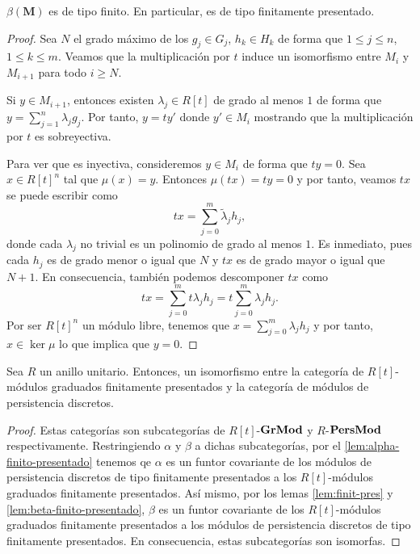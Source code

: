 \begin{lema}
	\label{lem:beta-finito-presentado}
	\(\beta(\mathbf{M})\) es de tipo finito. En particular, es de tipo finitamente presentado.
\end{lema}
\begin{proof}
	Sea \(N\) el grado máximo de los \(g_j \in G_j\), \(h_k \in H_k\) de forma que \(1 \leq j \leq n\), \(1 \leq k \leq m\). Veamos que la multiplicación por \(t\) induce un isomorfismo entre \(M_i\) y \(M_{i+1}\) para todo \(i \geq N\).
	
	Si \(y \in M_{i+1}\), entonces existen \(\lambda_j \in R[t]\) de grado al menos \(1\) de forma que \(y = \sum_{j=1}^n \lambda_j g_j\). Por tanto, \(y = ty'\) donde \(y' \in M_i\) mostrando que la multiplicación por \(t\) es sobreyectiva.
	
	Para ver que es inyectiva, consideremos \(y \in M_i\) de forma que \(ty = 0\). Sea \(x \in R[t]^n\) tal que \(\mu(x) = y\). Entonces \(\mu(tx) = ty = 0\) y por tanto, veamos \(tx\) se puede escribir como
	\[
		tx = \sum_{j=0}^m \tilde{\lambda}_j h_j,
	\]
	donde cada \(\lambda_j\) no trivial es un polinomio de grado al menos \(1\). Es inmediato, pues cada \(h_j\) es de grado menor o igual que \(N\) y \(tx\) es de grado mayor o igual que \(N+1\). En consecuencia, también podemos descomponer \(tx\) como
	\[
		tx = \sum_{j=0}^m t \lambda_j h_j = t \sum_{j=0}^m \lambda_j h_j.
	\]
	Por ser \(R[t]^n\) un módulo libre, tenemos que \( x = \sum_{j=0}^m \lambda_j h_j\) y por tanto, \(x \in \ker \mu\) lo que implica que \(y = 0\).
\end{proof}

\begin{teorema}
	\label{teo:correspondence}
	Sea \( R \) un anillo unitario. Entonces, un isomorfismo entre la categoría de \(R[t]\)-módulos graduados finitamente presentados y la categoría de módulos de persistencia discretos.
\end{teorema}
\begin{proof}
	Estas categorías son subcategorías de \(R[t]\)-\(\mathbf{GrMod}\) y \(R\)-\(\mathbf{PersMod}\) respectivamente. Restringiendo \(\alpha\) y \(\beta\) a dichas subcategorías, por el \autoref{lem:alpha-finito-presentado} tenemos qe \(\alpha\) es un funtor covariante de los módulos de persistencia discretos de tipo finitamente presentados a los \(R[t]\)-módulos graduados finitamente presentados. Así mismo, por los lemas \ref{lem:finit-pres} y \ref{lem:beta-finito-presentado}, \(\beta\) es un funtor covariante de los \(R[t]\)-módulos graduados finitamente presentados a los módulos de persistencia discretos de tipo finitamente presentados. En consecuencia, estas subcategorías son isomorfas.
\end{proof}


